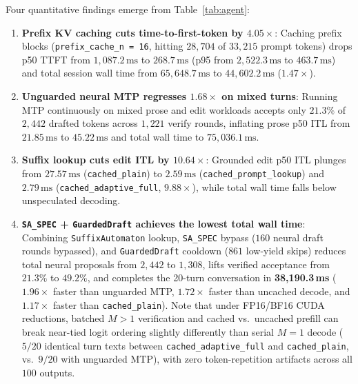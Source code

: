 \documentclass[11pt,a4paper]{article}
\begin{document}
Four quantitative findings emerge from Table~\ref{tab:agent}:
\begin{enumerate}[noitemsep]
  \item \textbf{Prefix KV caching cuts time-to-first-token by $4.05\times$}: Caching prefix blocks (\texttt{prefix\_cache\_n = 16}, hitting $28{,}704$ of $33{,}215$ prompt tokens) drops p50 TTFT from $1{,}087.2\,\text{ms}$ to $268.7\,\text{ms}$ (p95 from $2{,}522.3\,\text{ms}$ to $463.7\,\text{ms}$) and total session wall time from $65{,}648.7\,\text{ms}$ to $44{,}602.2\,\text{ms}$ ($1.47\times$).
  \item \textbf{Unguarded neural MTP regresses $1.68\times$ on mixed turns}: Running MTP continuously on mixed prose and edit workloads accepts only $21.3\%$ of $2{,}442$ drafted tokens across $1{,}221$ verify rounds, inflating prose p50 ITL from $21.85\,\text{ms}$ to $45.22\,\text{ms}$ and total wall time to $75{,}036.1\,\text{ms}$.
  \item \textbf{Suffix lookup cuts edit ITL by $10.64\times$}: Grounded edit p50 ITL plunges from $27.57\,\text{ms}$ (\texttt{cached\_plain}) to $2.59\,\text{ms}$ (\texttt{cached\_prompt\_lookup}) and $2.79\,\text{ms}$ (\texttt{cached\_adaptive\_full}, $9.88\times$), while total wall time falls below unspeculated decoding.
  \item \textbf{\texttt{SA\_SPEC} + \texttt{GuardedDraft} achieves the lowest total wall time}: Combining \texttt{SuffixAutomaton} lookup, \texttt{SA\_SPEC} bypass ($160$ neural draft rounds bypassed), and \texttt{GuardedDraft} cooldown ($861$ low-yield skips) reduces total neural proposals from $2{,}442$ to $1{,}308$, lifts verified acceptance from $21.3\%$ to $49.2\%$, and completes the 20-turn conversation in \textbf{38,190.3\,ms} ($1.96\times$ faster than unguarded MTP, $1.72\times$ faster than uncached decode, and $1.17\times$ faster than \texttt{cached\_plain}). Note that under FP16/BF16 CUDA reductions, batched $M>1$ verification and cached vs.\ uncached prefill can break near-tied logit ordering slightly differently than serial $M=1$ decode ($5/20$ identical turn texts between \texttt{cached\_adaptive\_full} and \texttt{cached\_plain}, vs.\ $9/20$ with unguarded MTP), with zero token-repetition artifacts across all $100$ outputs.
\end{enumerate}
\end{document}
